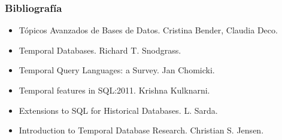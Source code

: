 \documentclass[12pt]{beamer}
\begin{document}
\begin{frame}
\frametitle{Bibliograf\'ia}
\begin{itemize}
\item T\'opicos Avanzados de Bases de Datos. Cristina Bender, Claudia Deco.
\item Temporal Databases. Richard T. Snodgrass.
\item Temporal Query Languages: a Survey. Jan Chomicki.
\item Temporal features in SQL:2011. Krishna Kulknarni.
\item Extensions to SQL for Historical Databases. L. Sarda.
\item Introduction to Temporal Database Research. Christian S. Jensen.
\end{itemize}
\end{frame}
\end{document}
